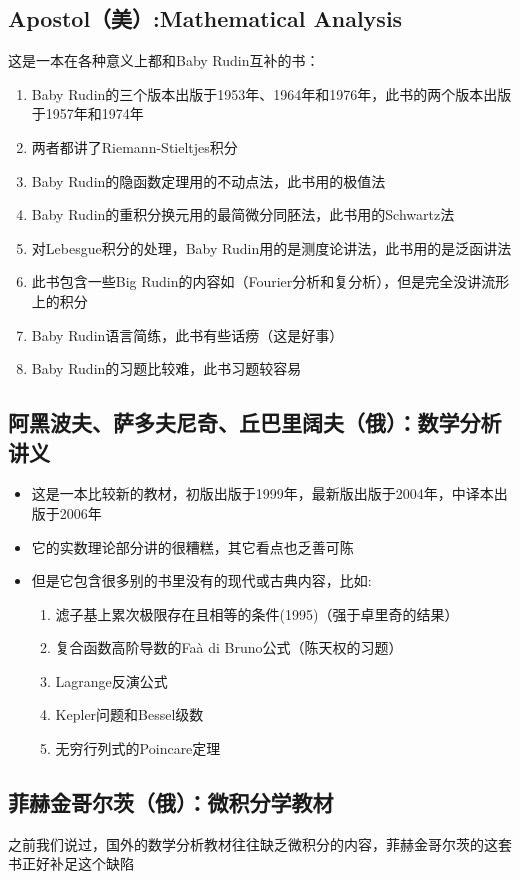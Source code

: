 \documentclass[UTF8]{article}
\begin{document}
    \subsection{Apostol（美）:Mathematical Analysis}
    这是一本在各种意义上都和Baby Rudin互补的书：\begin{enumerate}
        \item Baby Rudin的三个版本出版于1953年、1964年和1976年，此书的两个版本出版于1957年和1974年
        \item 两者都讲了Riemann-Stieltjes积分
        \item Baby Rudin的隐函数定理用的不动点法，此书用的极值法
        \item Baby Rudin的重积分换元用的最简微分同胚法，此书用的Schwartz法
        \item 对Lebesgue积分的处理，Baby Rudin用的是测度论讲法，此书用的是泛函讲法
        \item 此书包含一些Big Rudin的内容如（Fourier分析和复分析），但是完全没讲流形上的积分
        \item Baby Rudin语言简练，此书有些话痨（这是好事）
        \item Baby Rudin的习题比较难，此书习题较容易
    \end{enumerate}
    \subsection{阿黑波夫、萨多夫尼奇、丘巴里阔夫（俄）：数学分析讲义}
    \begin{itemize}
        \item 这是一本比较新的教材，初版出版于1999年，最新版出版于2004年，中译本出版于2006年
        \item 它的实数理论部分讲的很糟糕，其它看点也乏善可陈
        \item 但是它包含很多别的书里没有的现代或古典内容，比如:\begin{enumerate}
            \item 滤子基上累次极限存在且相等的条件(1995)（强于卓里奇的结果）
            \item 复合函数高阶导数的Faà di Bruno公式（陈天权的习题）
            \item Lagrange反演公式
            \item Kepler问题和Bessel级数
            \item 无穷行列式的Poincare定理
        \end{enumerate}
    \end{itemize}
    \subsection{菲赫金哥尔茨（俄）：微积分学教材}
    之前我们说过，国外的数学分析教材往往缺乏微积分的内容，菲赫金哥尔茨的这套书正好补足这个缺陷
\end{document}
